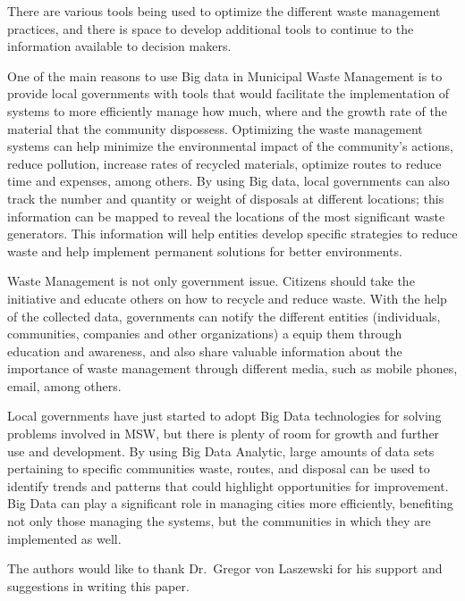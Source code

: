 There are various tools being used to optimize the different waste 
management practices, and there is space to develop additional tools 
to continue to the information available to decision makers.

One of the main reasons to use Big data in Municipal Waste Management is 
to provide local governments with tools that would facilitate the 
implementation of systems to more efficiently manage how much, where and 
the growth rate of the material that the community dispossess. Optimizing 
the waste management systems can help minimize the environmental impact of 
the community's actions, reduce pollution, increase rates of recycled 
materials, optimize routes to reduce time and expenses, among others.
By using Big data, local governments can also track the number and quantity 
or weight of disposals at different locations; this information can be 
mapped to reveal the locations of the most significant waste generators. 
This information will help entities develop specific strategies to reduce 
waste and help implement permanent solutions for better environments. 

Waste Management is not only government issue. Citizens should take the 
initiative and educate others on how to recycle and reduce waste. With the 
help of the collected data, governments can notify the different entities
 (individuals, communities, companies and other organizations) a equip them 
through education and awareness, and also share valuable information about 
the importance of waste management through different media, such as mobile 
phones, email, among others.

Local governments have just started to adopt Big Data technologies for 
solving problems involved in MSW, but there is plenty of room for growth 
and further use and development.  By using Big Data Analytic, large amounts 
of data sets pertaining to specific communities waste, routes, and disposal 
can be used to identify trends and patterns that could highlight opportunities 
for improvement. Big Data can play a significant role in managing cities more 
efficiently, benefiting not only those managing the systems, but the 
communities in which they are implemented as well.
\begin{acks}

The authors would like to thank Dr.\ Gregor von Laszewski for his support 
and suggestions in writing this paper.

\end{acks}

 
